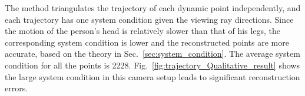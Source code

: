 The method triangulates the trajectory of each dynamic point independently, and 
each trajectory has one system condition given the viewing ray directions. 
Since the motion of the person's head is relatively slower than that of his legs, the corresponding system condition is lower and the reconstructed points are more accurate, based on the theory in Sec.~\ref{sec:system_condition}. 
The average system condition for all the points is 2228. 
Fig.~\ref{fig:trajectory_Qualitative_result} shows the large system condition in this camera setup leads to significant reconstruction errors.

\begin{figure}[t]
\centering
{}
\end{figure}
